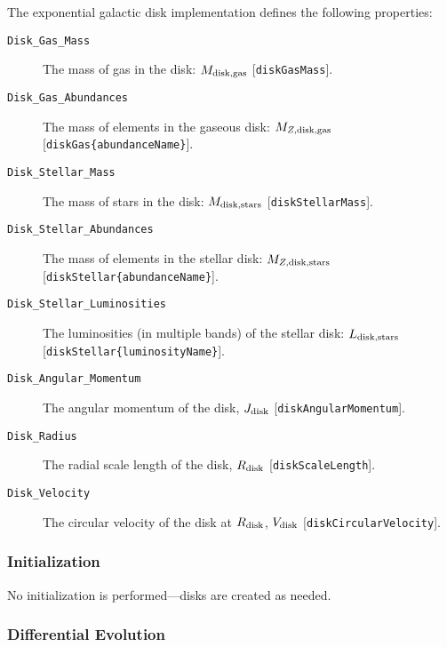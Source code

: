 The exponential galactic disk implementation defines the following properties:
\begin{description}
 \item [{\tt Disk\_Gas\_Mass}] The mass of gas in the disk: $M_{\rm disk, gas}$ [{\tt diskGasMass}].
 \item [{\tt Disk\_Gas\_Abundances}] The mass of elements in the gaseous disk: $M_{Z, {\rm disk, gas}}$ [{\tt diskGas\{abundanceName\}}].
 \item [{\tt Disk\_Stellar\_Mass}] The mass of stars in the disk: $M_{\rm disk, stars}$ [{\tt diskStellarMass}].
 \item [{\tt Disk\_Stellar\_Abundances}] The mass of elements in the stellar disk: $M_{Z, {\rm disk, stars}}$ [{\tt diskStellar\{abundanceName\}}].
 \item [{\tt Disk\_Stellar\_Luminosities}] The luminosities (in multiple bands) of the stellar disk: $L_{\rm disk, stars}$ [{\tt diskStellar\{luminosityName\}}].
 \item [{\tt Disk\_Angular\_Momentum}] The angular momentum of the disk, $J_{\rm disk}$ [{\tt diskAngularMomentum}].
 \item [{\tt Disk\_Radius}] The radial scale length of the disk, $R_{\rm disk}$ [{\tt diskScaleLength}].
 \item [{\tt Disk\_Velocity}] The circular velocity of the disk at $R_{\rm disk}$, $V_{\rm disk}$ [{\tt diskCircularVelocity}].
\end{description}

\subsubsection{Initialization}

No initialization is performed---disks are created as needed.

\subsubsection{Differential Evolution}

